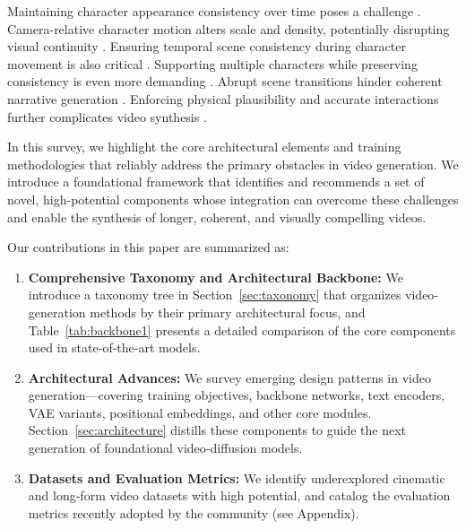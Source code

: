 Maintaining character appearance consistency over time poses a challenge \cite{tulyakov2018mocogan}. Camera-relative character motion alters scale and density, potentially disrupting visual continuity \cite{brooks2022generating}. Ensuring temporal scene consistency during character movement is also critical \cite{yan2022temporally}. Supporting multiple characters while preserving consistency is even more demanding \cite{lin2023videodirectorgpt}. Abrupt scene transitions hinder coherent narrative generation \cite{wu2025mind}. Enforcing physical plausibility and accurate interactions further complicates video synthesis \cite{yang2025towards}.

In this survey, we highlight the core architectural elements and training methodologies that reliably address the primary obstacles in video generation. We introduce a foundational framework that identifies and recommends a set of novel, high-potential components whose integration can overcome these challenges and enable the synthesis of longer, coherent, and visually compelling videos. 


Our contributions in this paper are summarized as:
\begin{enumerate}
  \item \textbf{Comprehensive Taxonomy and Architectural Backbone:} We introduce a taxonomy tree in Section~\ref{sec:taxonomy} that organizes video‐generation methods by their primary architectural focus, and Table~\ref{tab:backbone1} presents a detailed comparison of the core components used in state‐of‐the‐art models.

  \item \textbf{Architectural Advances:} We survey emerging design patterns in video generation—covering training objectives, backbone networks, text encoders, VAE variants, positional embeddings, and other core modules. Section~\ref{sec:architecture} distills these components to guide the next generation of foundational video‐diffusion models.

  \item \textbf{Datasets and Evaluation Metrics:} We identify underexplored cinematic and long‐form video datasets with high potential, and catalog the evaluation metrics recently adopted by the community (see Appendix).
\end{enumerate}